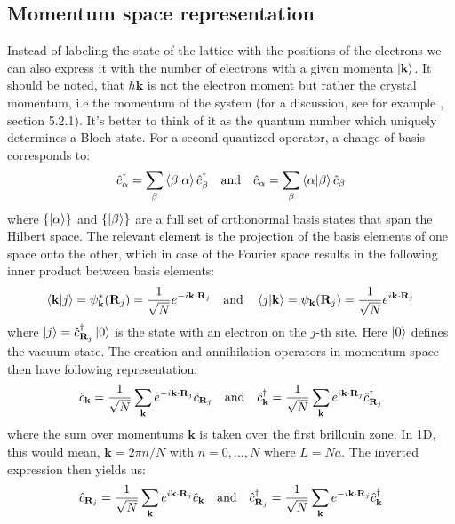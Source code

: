 \documentclass[11pt, a4paper, oneside]{book}
\theoremstyle{definition} %
\begin{document}
\subsection{Momentum space representation}
\label{sec:monentum_space_representation}
Instead of labeling the state of the lattice with the positions of the electrons we can also express it with the number of electrons with a given momenta $\ket{\mathbf{k}}$. It should be noted, that $\hbar \mathbf{k}$ is not the electron moment but rather the crystal momentum, i.e the momentum of the system (for a discussion, see for example \cite{Singleton}, section 5.2.1). It's better to think of it as the quantum number which uniquely determines a Bloch state. For a second quantized operator, a change of basis corresponds to:
\begin{equation}
	\hat{c}_\alpha^\dagger = \sum_\beta \braket{\beta}{\alpha} \hat{c}_\beta^\dagger \qq{and} \hat{c}_\alpha = \sum_\beta \braket{\alpha}{\beta} \hat{c}_\beta
\end{equation}
where $\{\ket{\alpha} \}$ and $\{\ket{\beta}\}$ are a full set of orthonormal basis states that span the Hilbert space. The relevant element is the projection of the basis elements of one space onto the other, which in case of the Fourier space results in the following inner product between basis elements:
\begin{equation}
	\braket{\mathbf{k}}{j} = \psi_{\mathbf{k}}^*(\mathbf{R}_j) = \frac{1}{\sqrt{N}} e^{-i \mathbf{k} \cdot \mathbf{R}_j} \qq{and} \braket{j}{\mathbf{k}} = \psi_\mathbf{k}(\mathbf{R}_j) = \frac{1}{\sqrt{N}} e^{i \mathbf{k} \cdot \mathbf{R}_j}
\end{equation}
where $\ket{j} = \hat{c}_{\mathbf{R}_j}^\dagger \ket{0}$ is the state with an electron on the $j$-th site. Here $\ket{0}$ defines the vacuum state. The creation and annihilation operators in momentum space then have following representation:
\begin{equation}
	\hat{c}_{\mathbf{k}} = \frac{1}{\sqrt{N}}  \sum_{\mathbf{k}} e^{-i \mathbf{k}\cdot \mathbf{R}_j} \hat{c}_{\mathbf{R}_j} \qq{and} \hat{c}_\mathbf{k}^\dagger = \frac{1}{\sqrt{N}} \sum_\mathbf{k} e^{i \mathbf{k} \cdot \mathbf{R}_j} \hat{c}_{\mathbf{R}_j}^\dagger
\end{equation}
where the sum over momentums $\mathbf{k}$ is taken over the first brillouin zone. In 1D, this would mean, $\mathbf{k} = 2\pi n/ N$ with $n = 0, \dots, N$ where $L = Na$. The inverted expression then yields us:
\begin{equation}
	\hat{c}_{\mathbf{R}_j} = \frac{1}{\sqrt{N}} \sum_{\mathbf{k}} e^{i \mathbf{k}\cdot \mathbf{R}_j} \hat{c}_\mathbf{k} \qq{and} \hat{c}_{\mathbf{R}_j}^\dagger = \frac{1}{\sqrt{N}} \sum_{\mathbf{k}} e^{-i\mathbf{k}\cdot \mathbf{R}_j} \hat{c}_\mathbf{k}^\dagger
\end{equation}
\end{document}

